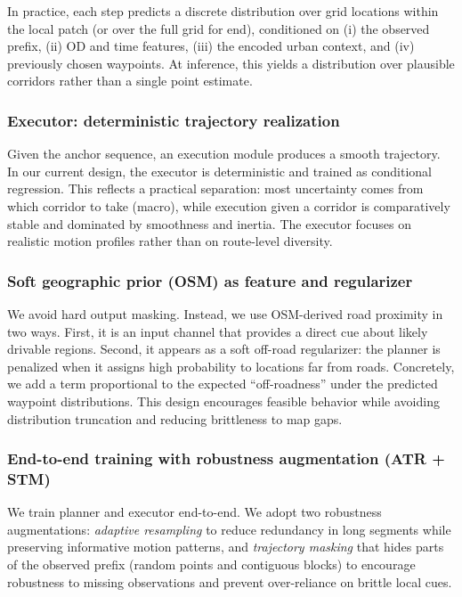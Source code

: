 In practice, each step predicts a discrete distribution over grid locations within the local patch (or over the full grid for end), conditioned on (i) the observed prefix, (ii) OD and time features, (iii) the encoded urban context, and (iv) previously chosen waypoints. At inference, this yields a distribution over plausible corridors rather than a single point estimate.

\subsubsection{Executor: deterministic trajectory realization}
Given the anchor sequence, an execution module produces a smooth trajectory. In our current design, the executor is deterministic and trained as conditional regression. This reflects a practical separation: most uncertainty comes from which corridor to take (macro), while execution given a corridor is comparatively stable and dominated by smoothness and inertia. The executor focuses on realistic motion profiles rather than on route-level diversity.

\subsubsection{Soft geographic prior (OSM) as feature and regularizer}
We avoid hard output masking. Instead, we use OSM-derived road proximity in two ways.
First, it is an input channel that provides a direct cue about likely drivable regions. Second, it appears as a soft off-road regularizer: the planner is penalized when it assigns high probability to locations far from roads. Concretely, we add a term proportional to the expected ``off-roadness'' under the predicted waypoint distributions. This design encourages feasible behavior while avoiding distribution truncation and reducing brittleness to map gaps.

\subsubsection{End-to-end training with robustness augmentation (ATR + STM)}
We train planner and executor end-to-end. We adopt two robustness augmentations:
\emph{adaptive resampling} to reduce redundancy in long segments while preserving informative motion patterns, and
\emph{trajectory masking} that hides parts of the observed prefix (random points and contiguous blocks) to encourage robustness to missing observations and prevent over-reliance on brittle local cues.

